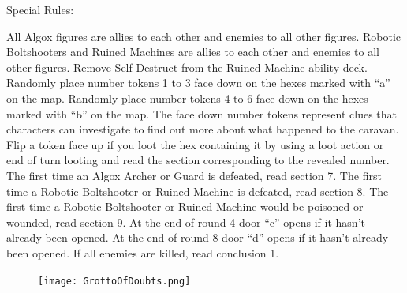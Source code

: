 \documentclass[fontsize=11pt]{scrartcl}
\begin{document}
\begin{multicols}{3}
    \begin{center}
	    \LARGE{\textcolor{Sepia}{Special Rules:}}
		\end{center}
	  \footnotesize{All Algox figures are allies to each other and enemies to all other figures. Robotic Boltshooters and Ruined Machines are allies to each other and enemies to all other figures. Remove Self-Destruct from the Ruined Machine ability deck. Randomly place number tokens 1 to 3 face down on the hexes marked with “a” on the map. Randomly place number tokens 4 to 6 face down on the hexes marked with “b” on the map. The face down number tokens represent clues that characters can investigate to find out more about what happened to the caravan. Flip a token face up if you loot the hex containing it by using a loot action or end of turn looting and read the section corresponding to the revealed number.\newline\newline
The first time an Algox Archer or Guard is defeated, read section 7. The first time a Robotic Boltshooter or Ruined Machine is defeated, read section 8. The first time a Robotic Boltshooter or Ruined Machine would be poisoned or wounded, read section 9. At the end of round 4 door “c” opens if it hasn’t already been opened. At the end of round 8 door “d” opens if it hasn’t already been opened. If all enemies are killed, read conclusion 1.}
  \end{multicols}
	\begin{figure}[b]
    \centering
		\vspace*{-5cm}
    \texttt{[image: GrottoOfDoubts.png]}
  \end{figure}
	\newpage
\end{document}
